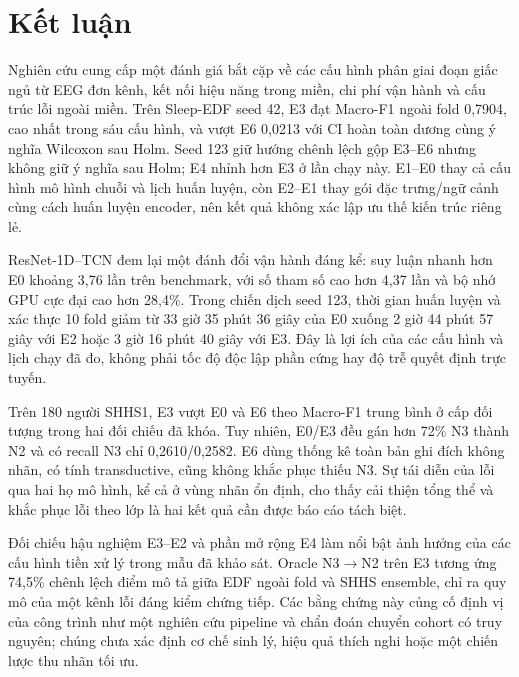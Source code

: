 \section{Kết luận}
\label{sec:conclusion}

Nghiên cứu cung cấp một đánh giá bắt cặp về các cấu hình phân giai đoạn giấc ngủ từ EEG đơn kênh, kết nối hiệu năng trong miền, chi phí vận hành và cấu trúc lỗi ngoài miền. Trên Sleep-EDF seed 42, E3 đạt Macro-F1 ngoài fold 0,7904, cao nhất trong sáu cấu hình, và vượt E6 0,0213 với CI hoàn toàn dương cùng ý nghĩa Wilcoxon sau Holm. Seed 123 giữ hướng chênh lệch gộp E3--E6 nhưng không giữ ý nghĩa sau Holm; E4 nhỉnh hơn E3 ở lần chạy này. E1--E0 thay cả cấu hình mô hình chuỗi và lịch huấn luyện, còn E2--E1 thay gói đặc trưng/ngữ cảnh cùng cách huấn luyện encoder, nên kết quả không xác lập ưu thế kiến trúc riêng lẻ.

ResNet-1D--TCN đem lại một đánh đổi vận hành đáng kể: suy luận nhanh hơn E0 khoảng 3,76 lần trên benchmark, với số tham số cao hơn 4,37 lần và bộ nhớ GPU cực đại cao hơn 28,4\%. Trong chiến dịch seed 123, thời gian huấn luyện và xác thực 10 fold giảm từ 33 giờ 35 phút 36 giây của E0 xuống 2 giờ 44 phút 57 giây với E2 hoặc 3 giờ 16 phút 40 giây với E3. Đây là lợi ích của các cấu hình và lịch chạy đã đo, không phải tốc độ độc lập phần cứng hay độ trễ quyết định trực tuyến.

Trên 180 người SHHS1, E3 vượt E0 và E6 theo Macro-F1 trung bình ở cấp đối tượng trong hai đối chiếu đã khóa. Tuy nhiên, E0/E3 đều gán hơn 72\% N3 thành N2 và có recall N3 chỉ 0,2610/0,2582. E6 dùng thống kê toàn bản ghi đích không nhãn, có tính transductive, cũng không khắc phục thiếu N3. Sự tái diễn của lỗi qua hai họ mô hình, kể cả ở vùng nhãn ổn định, cho thấy cải thiện tổng thể và khắc phục lỗi theo lớp là hai kết quả cần được báo cáo tách biệt.

Đối chiếu hậu nghiệm E3--E2 và phần mở rộng E4 làm nổi bật ảnh hưởng của các cấu hình tiền xử lý trong mẫu đã khảo sát. Oracle N3$\rightarrow$N2 trên E3 tương ứng 74,5\% chênh lệch điểm mô tả giữa EDF ngoài fold và SHHS ensemble, chỉ ra quy mô của một kênh lỗi đáng kiểm chứng tiếp. Các bằng chứng này củng cố định vị của công trình như một nghiên cứu pipeline và chẩn đoán chuyển cohort có truy nguyên; chúng chưa xác định cơ chế sinh lý, hiệu quả thích nghi hoặc một chiến lược thu nhãn tối ưu.
